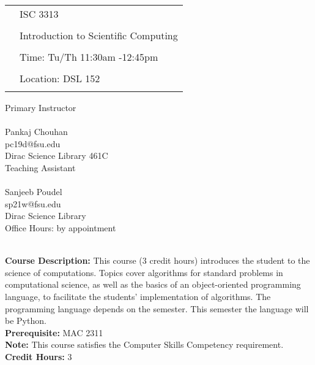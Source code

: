 \documentclass[11pt]{article}
\begin{document}
\begin{tabular}{ l l }
  \multirow{3}{*}{} & \LARGE ISC 3313 \\\\
  & \LARGE Introduction to Scientific Computing \\\\
  & \LARGE Time: Tu/Th 11:30am -12:45pm\\\\
  & \LARGE Location: DSL 152 \\\\
\end{tabular}
\vspace{10mm}

\Large Primary Instructor \\ \\
\large Pankaj Chouhan\\
\large pc19d@fsu.edu \\
 \large Dirac Science Library 461C \\
 
 \Large Teaching Assistant \\ \\
 \large Sanjeeb Poudel \\ 
 \large sp21w@fsu.edu\\
 \large Dirac Science Library \\
 \large Office Hours: by appointment
\vspace{5mm}

\textbf {\large \\ Course Description:} This course (3 credit hours) introduces the student to the science of computations. Topics cover algorithms for standard problems in computational science, as well as the basics of an object-oriented programming language, to facilitate the students' implementation of algorithms. The programming language depends on the semester. This semester the language will be Python. \\

\textbf {Prerequisite:} MAC 2311\\

\textbf {Note:} This course satisfies the Computer Skills Competency requirement. \\

\textbf {Credit Hours:} 3 \\
\end{document}
